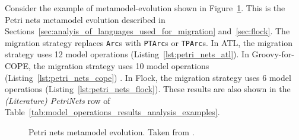Consider the example of metamodel-evolution shown in Figure~\ref{fig:quantitive_petri_nets_mms}. This is the Petri nets metamodel evolution described in Sections~\ref{sec:analyis_of_languages_used_for_migration} and~\ref{sec:flock}. The migration strategy replaces \texttt{Arc}s with \texttt{PTArc}s or \texttt{TPArc}s. In ATL, the migration strategy uses 12 model operations (Listing~\ref{lst:petri_nets_atl}). In Groovy-for-COPE, the migration strategy uses 10 model operations (Listing~\ref{lst:petri_nets_cope}) . In Flock, the migration strategy uses 6 model operations (Listing~\ref{lst:petri_nets_flock}). These results are also shown in the \emph{(Literature) PetriNets} row of Table~\ref{tab:model_operations_results_analysis_examples}.

\begin{figure}[tbp]
	\centering
	\caption[Petri nets metamodel evolution]{Petri nets metamodel evolution. Taken from \cite{rose10flock}.}
\label{fig:quantitive_petri_nets_mms}
\end{figure}

